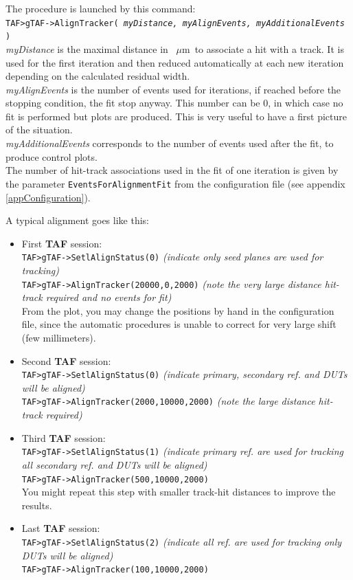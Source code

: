 \documentclass[a4paper, 12pt, twoside]{article}
\def\mm{~$\mu$m}
\newcommand{\TAF}{{\bf TAF }}
\begin{document}
\noindent
The procedure is launched by this command:\\
{\tt TAF>gTAF->AlignTracker( {\it myDistance, myAlignEvents, myAdditionalEvents} )}\\

\noindent
{\it myDistance} is the maximal distance in \mm\ to associate a hit with a track. It is used for the first iteration and then reduced  automatically at each new iteration depending on the calculated residual width.\\
{\it myAlignEvents} is the number of events used for iterations, if reached before the stopping condition, the fit stop anyway. This number can be 0, in which case no fit is performed but plots are produced. This is very useful to have a first picture of the situation.\\
{\it myAdditionalEvents} corresponds to the number of events used after the fit, to produce control plots.\\
The number of hit-track associations used in the fit of one iteration is given by the parameter {\tt EventsForAlignmentFit} from the configuration file (see appendix \ref{appConfiguration}).

\noindent
A typical alignment goes like this:
\begin{itemize}
\setlength{\itemsep}{1mm}
\item First \TAF session:\\
{\tt TAF>gTAF->SetlAlignStatus(0)} {\it(indicate only seed planes are used for tracking)}\\
{\tt TAF>gTAF->AlignTracker(20000,0,2000)} {\it(note the very large distance hit-track required and no events for fit)}\\
From the plot, you may change the positions by hand in the configuration file, since the automatic procedures is unable to correct for very large shift (few millimeters). 
\item Second \TAF session:\\
{\tt TAF>gTAF->SetlAlignStatus(0)} {\it(indicate primary, secondary ref. and DUTs will be aligned)}\\
{\tt TAF>gTAF->AlignTracker(2000,10000,2000)} {\it(note the large distance hit-track required)}
\item Third \TAF session:\\
{\tt TAF>gTAF->SetlAlignStatus(1)} {\it(indicate primary ref. are used for tracking all secondary ref. and DUTs will be aligned)}\\
{\tt TAF>gTAF->AlignTracker(500,10000,2000)}\\
You might repeat this step with smaller track-hit distances to improve the results.
\item Last \TAF session:\\
{\tt TAF>gTAF->SetlAlignStatus(2)} {\it(indicate all ref. are used for tracking only DUTs will be aligned)}\\
{\tt TAF>gTAF->AlignTracker(100,10000,2000)}\\
\end{itemize}
\end{document}
